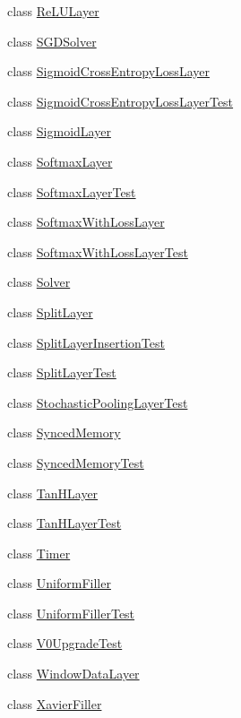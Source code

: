 \begin{DoxyCompactItemize}
\item 
class \hyperlink{classcaffe_1_1_re_l_u_layer}{Re\+L\+U\+Layer}
\item 
class \hyperlink{classcaffe_1_1_s_g_d_solver}{S\+G\+D\+Solver}
\item 
class \hyperlink{classcaffe_1_1_sigmoid_cross_entropy_loss_layer}{Sigmoid\+Cross\+Entropy\+Loss\+Layer}
\item 
class \hyperlink{classcaffe_1_1_sigmoid_cross_entropy_loss_layer_test}{Sigmoid\+Cross\+Entropy\+Loss\+Layer\+Test}
\item 
class \hyperlink{classcaffe_1_1_sigmoid_layer}{Sigmoid\+Layer}
\item 
class \hyperlink{classcaffe_1_1_softmax_layer}{Softmax\+Layer}
\item 
class \hyperlink{classcaffe_1_1_softmax_layer_test}{Softmax\+Layer\+Test}
\item 
class \hyperlink{classcaffe_1_1_softmax_with_loss_layer}{Softmax\+With\+Loss\+Layer}
\item 
class \hyperlink{classcaffe_1_1_softmax_with_loss_layer_test}{Softmax\+With\+Loss\+Layer\+Test}
\item 
class \hyperlink{classcaffe_1_1_solver}{Solver}
\item 
class \hyperlink{classcaffe_1_1_split_layer}{Split\+Layer}
\item 
class \hyperlink{classcaffe_1_1_split_layer_insertion_test}{Split\+Layer\+Insertion\+Test}
\item 
class \hyperlink{classcaffe_1_1_split_layer_test}{Split\+Layer\+Test}
\item 
class \hyperlink{classcaffe_1_1_stochastic_pooling_layer_test}{Stochastic\+Pooling\+Layer\+Test}
\item 
class \hyperlink{classcaffe_1_1_synced_memory}{Synced\+Memory}
\item 
class \hyperlink{classcaffe_1_1_synced_memory_test}{Synced\+Memory\+Test}
\item 
class \hyperlink{classcaffe_1_1_tan_h_layer}{Tan\+H\+Layer}
\item 
class \hyperlink{classcaffe_1_1_tan_h_layer_test}{Tan\+H\+Layer\+Test}
\item 
class \hyperlink{classcaffe_1_1_timer}{Timer}
\item 
class \hyperlink{classcaffe_1_1_uniform_filler}{Uniform\+Filler}
\item 
class \hyperlink{classcaffe_1_1_uniform_filler_test}{Uniform\+Filler\+Test}
\item 
class \hyperlink{classcaffe_1_1_v0_upgrade_test}{V0\+Upgrade\+Test}
\item 
class \hyperlink{classcaffe_1_1_window_data_layer}{Window\+Data\+Layer}
\item 
class \hyperlink{classcaffe_1_1_xavier_filler}{Xavier\+Filler}
\end{DoxyCompactItemize}
